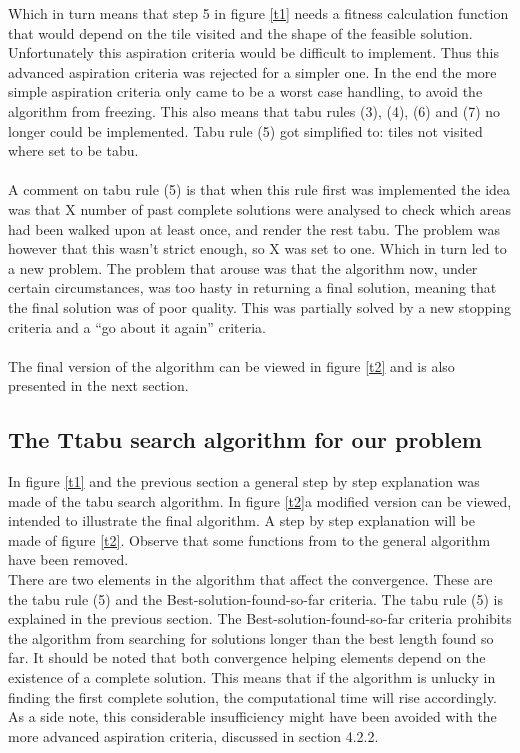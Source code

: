 Which in turn means that step 5 in figure \ref{t1} needs a fitness calculation function that would depend on the tile visited and the shape of the feasible solution. Unfortunately this aspiration criteria would be difficult to implement. Thus this advanced aspiration criteria was rejected for a simpler one. In the end the more simple aspiration criteria only came to be a worst case handling, to avoid the algorithm from freezing. This also means that tabu rules (3), (4), (6) and (7) no longer could be implemented. Tabu rule (5) got simplified to: tiles not visited where set to be tabu.\\
\\A comment on tabu rule (5) is that when this rule first was implemented the idea was that X number of past complete solutions were analysed to check which areas had been walked upon at least once, and render the rest tabu. The problem was however that this wasn't strict enough, so X was set to one. Which in turn led to a new problem. The problem that arouse was that the algorithm now, under certain circumstances, was too hasty in returning a final solution, meaning that the final solution was of poor quality. This was partially solved by a new stopping criteria and a ``go about it again'' criteria.\\
\\The final version of the algorithm can be viewed in figure \ref{t2} and is also presented in the next section.
\subsection{The Ttabu search algorithm for our problem}
In figure \ref{t1} and the previous section a general step by step explanation was made of the tabu search algorithm. In figure \ref{t2}a modified version can be viewed, intended to illustrate the final algorithm. A step by step explanation will be made of figure \ref{t2}. Observe that some functions from to the general algorithm have been removed.\\

There are two elements in the algorithm that affect the convergence. These are the tabu rule (5) and the Best-solution-found-so-far criteria. The tabu rule (5) is explained in the previous section. The Best-solution-found-so-far criteria prohibits the algorithm from searching for solutions longer than the best length found so far. It should be noted that both convergence helping elements depend on the existence of a complete solution. This means that if the algorithm is unlucky in finding the first complete solution, the computational time will rise accordingly. As a side note, this considerable insufficiency might have been avoided with the more advanced aspiration criteria, discussed in section 4.2.2.

